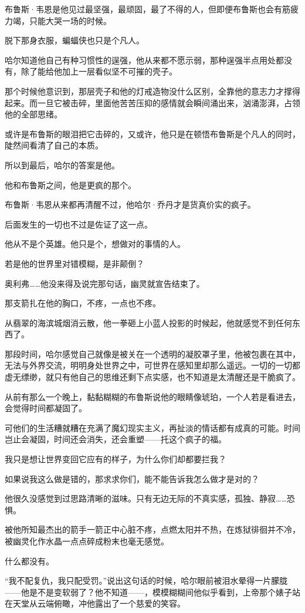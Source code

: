 \documentclass[../main]{subfiles}
\begin{document}
布鲁斯·韦恩是他见过最坚强，最顽固，最了不得的人，但即便布鲁斯也会有筋疲力竭，只能大哭一场的时候。

脱下那身衣服，蝙蝠侠也只是个凡人。

哈尔知道他自己有种习惯性的逞强，他从来都不愿示弱，那种逞强半点用处都没有，除了能给他加上一层看似坚不可摧的壳子。

那个时候他意识到，那层壳子和他的灯戒造物没什么区别，全靠他的意志力才撑得起来。而一旦它被击碎，里面他苦苦压抑的感情就会瞬间涌出来，汹涌澎湃，占领他的全部思绪。

或许是布鲁斯的眼泪把它击碎的，又或许，他只是在顿悟布鲁斯是个凡人的同时，陡然间看清了自己的本质。

所以到最后，哈尔的答案是他。

他和布鲁斯之间，他是更疯的那个。

布鲁斯·韦恩从来都再清醒不过，他哈尔·乔丹才是货真价实的疯子。

后面发生的一切也不过是佐证了这一点。

他从不是个英雄。他只是个，想做对的事情的人。

若是他的世界里对错模糊，是非颠倒？

奥利弗……他没来得及说完那句话，幽灵就宣告结束了。

那支箭扎在他的胸口，不疼，一点也不疼。

从翡翠的海滨城烟消云散，他一拳砸上小蓝人投影的时候起，他就感觉不到任何东西了。

那段时间，哈尔感觉自己就像是被关在一个透明的凝胶罩子里，他被包裹在其中，无法与外界交流，明明身处世界之中，可世界在感知里却那么遥远。一切的一切都虚无缥缈，就只有他自己的思维还剩下点实感，也不知道是太清醒还是干脆疯了。

从前有那么一个晚上，黏黏糊糊的布鲁斯说他的眼睛像琥珀，一个人若是看进去，会觉得时间都凝固了。

可他们的生活糟就糟在充满了魔幻现实主义，再扯淡的情话都有成真的可能。时间岂止会凝固，时间还会消失，还会重塑——托这个疯子的福。

我只是想让世界变回它应有的样子，为什么你们却都要拦我？

如果说我这么做是错的，那求求你们，能不能告诉我怎么做才是对的？

他很久没感觉到过思路清晰的滋味。只有无边无际的不真实感，孤独、静寂……恐惧。

被他所知最杰出的箭手一箭正中心脏不疼，点燃太阳并不热，在炼狱徘徊并不冷，被幽灵化作水晶一点点碎成粉末也毫无感觉。

什么都没有。

“我不配复仇，我只配受罚。”说出这句话的时候，哈尔眼前被泪水晕得一片朦胧——他是不是变软弱了？他不知道——，模模糊糊间他似乎看到，上帝那个婊子站在天堂从云端俯瞰，冲他露出了一个慈爱的笑容。
\end{document}
